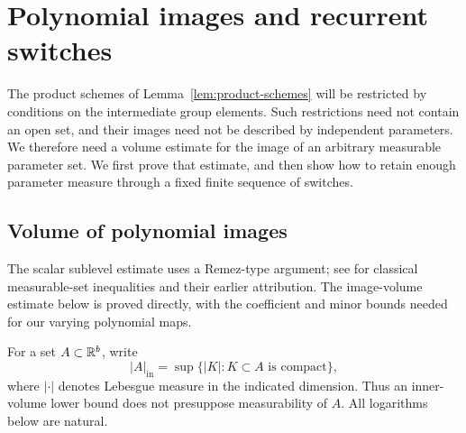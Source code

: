 \section{Polynomial images and recurrent switches}
\label{sec:polynomial-volume}

The product schemes of Lemma~\ref{lem:product-schemes} will be
restricted by conditions on the intermediate group elements.  Such restrictions
need not contain an open set, and their images need not be described by
independent parameters.  We therefore need a volume estimate for the
image of an arbitrary measurable parameter set.  We first prove that
estimate, and then show how to retain enough parameter measure through
a fixed finite sequence of switches.

\subsection{Volume of polynomial images}

The scalar sublevel estimate uses a Remez-type argument; see
\cite[Theorems~1.1--1.2]{Ganzburg2017} for classical measurable-set
inequalities and their earlier attribution. The image-volume estimate
below is proved directly, with the coefficient and minor bounds needed
for our varying polynomial maps.

For a set $A\subset\mathbb R^b$, write
\[
 |A|_{\mathrm{in}}
   =\sup\{|K|:K\subset A\text{ is compact}\},
\]
where $|\cdot|$ denotes Lebesgue measure in the indicated dimension.
Thus an inner-volume lower bound does not presuppose measurability of
$A$.  All logarithms below are natural.

